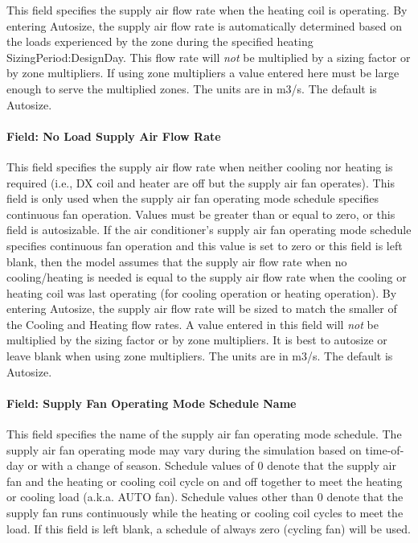 This field specifies the supply air flow rate when the heating coil is operating. By entering Autosize, the supply air flow rate is automatically determined based on the loads experienced by the zone during the specified heating SizingPeriod:DesignDay. This flow rate will \emph{not} be multiplied by a sizing factor or by zone multipliers. If using zone multipliers a value entered here must be large enough to serve the multiplied zones. The units are in m3/s. The default is Autosize.

\paragraph{Field: No Load Supply Air Flow Rate}\label{field-no-load-supply-air-flow-rate-4}

This field specifies the supply air flow rate when neither cooling nor heating is required (i.e., DX coil and heater are off but the supply air fan operates). This field is only used when the supply air fan operating mode schedule specifies continuous fan operation. Values must be greater than or equal to zero, or this field is autosizable. If the air conditioner's supply air fan operating mode schedule specifies continuous fan operation and this value is set to zero or this field is left blank, then the model assumes that the supply air flow rate when no cooling/heating is needed is equal to the supply air flow rate when the cooling or heating coil was last operating (for cooling operation or heating operation). By entering Autosize, the supply air flow rate will be sized to match the smaller of the Cooling and Heating flow rates. A value entered in this field will \emph{not} be multiplied by the sizing factor or by zone multipliers. It is best to autosize or leave blank when using zone multipliers. The units are in m3/s. The default is Autosize.

\paragraph{Field: Supply Fan Operating Mode Schedule Name}\label{field-supply-fan-operating-mode-schedule-name-6}

This field specifies the name of the supply air fan operating mode schedule. The supply air fan operating mode may vary during the simulation based on time-of-day or with a change of season. Schedule values of 0 denote that the supply air fan and the heating or cooling coil cycle on and off together to meet the heating or cooling load (a.k.a. AUTO fan). Schedule values other than 0 denote that the supply fan runs continuously while the heating or cooling coil cycles to meet the load. If this field is left blank, a schedule of always zero (cycling fan) will be used.

